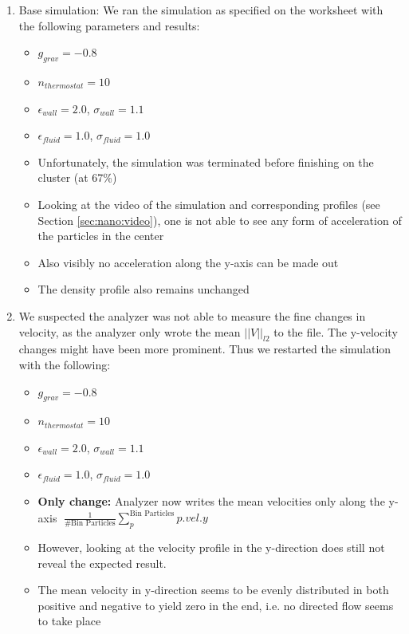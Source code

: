 \documentclass{article}
\begin{document}
    \begin{enumerate}
        \item Base simulation: We ran the simulation as specified on the worksheet with the following parameters and results:
        \begin{itemize}
            \item $g_{grav} = -0.8$
            \item $n_{thermostat} = 10$
            \item $\epsilon_{wall} = 2.0$, $\sigma_{wall} = 1.1$
            \item $\epsilon_{fluid} = 1.0$, $\sigma_{fluid} = 1.0$
            \item Unfortunately, the simulation was terminated before finishing on the cluster (at 67\%)
            \item Looking at the video of the simulation and corresponding profiles (see Section \ref{sec:nano:video}), one is not able to see any form of acceleration of the particles in the center
            \item Also visibly no acceleration along the y-axis can be made out
            \item The density profile also remains unchanged
        \end{itemize}
        \item We suspected the analyzer was not able to measure the fine changes in velocity, as the analyzer only wrote the mean $||V||_{l2}$ to the file. The y-velocity changes might have been more prominent. Thus we restarted the simulation with the following:
        \begin{itemize}
            \item $g_{grav} = -0.8$
            \item $n_{thermostat} = 10$
            \item $\epsilon_{wall} = 2.0$, $\sigma_{wall} = 1.1$
            \item $\epsilon_{fluid} = 1.0$, $\sigma_{fluid} = 1.0$
            \item \textbf{Only change:} Analyzer now writes the mean velocities only along the y-axis $\; \frac{1}{\text{\#Bin Particles}}\sum_{p}^{\text{Bin Particles}} p.vel.y$
            \item However, looking at the velocity profile in the y-direction does still not reveal the expected result.
            \item The mean velocity in y-direction seems to be evenly distributed in both positive and negative to yield zero in the end, i.e. no directed flow seems to take place

\end{itemize}
\end{enumerate}
\end{document}
